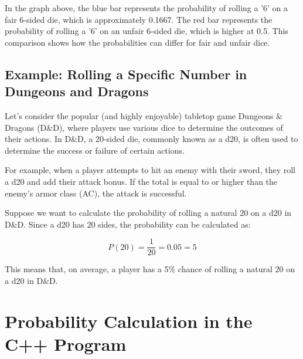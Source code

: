 \documentclass{article}
\begin{document}
\begin{center}
\end{center}

In the graph above, the blue bar represents the probability of rolling a '6' on a fair 6-sided die, which is
approximately 0.1667. The red bar represents the probability of rolling a '6' on an unfair 6-sided die, which is
higher at 0.5. This comparison shows how the probabilities can differ for fair and unfair dice.

\subsection{Example: Rolling a Specific Number in Dungeons and Dragons}

Let's consider the popular (and highly enjoyable) tabletop game Dungeons \& Dragons (D\&D), where players use
various dice to determine the outcomes of their actions. In D\&D, a 20-sided die, commonly known as a d20, is often
used to determine the success or failure of certain actions.

For example, when a player attempts to hit an enemy with their sword, they roll a d20 and add their attack bonus.
If the total is equal to or higher than the enemy's armor class (AC), the attack is successful.

Suppose we want to calculate the probability of rolling a natural 20 on a d20 in D\&D. Since a d20 has 20 sides, the
probability can be calculated as:

\[
P(20) = \frac{1}{20} = 0.05 = 5%
\]

This means that, on average, a player has a 5\% chance of rolling a natural 20 on a d20 in D\&D.

\section{Probability Calculation in the C++ Program}
\end{document}

